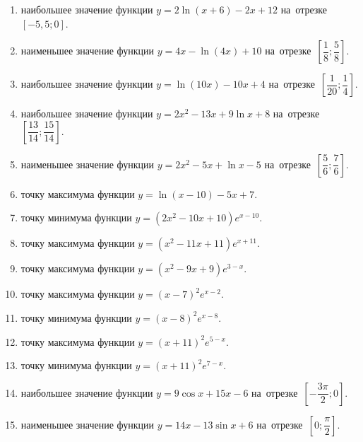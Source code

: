 \documentclass[a4paper,10pt]{article}
\begin{document}
\begin{enumerate}
\item {} наибольшее значение функции $y=2\ln \left(x+6\right)-2x+12$ на~отрезке~$\left[-5,5;0\right]$.

\item {} наименьшее значение функции $y=4x-\ln \left(4x\right)+10$ на~отрезке~$\left[\dfrac{1}{8};\dfrac{5}{8}\right]$.

\item {} наибольшее значение функции $y=\ln \left(10x\right)-10x+4$ на~отрезке~$\left[\dfrac{1}{20};\dfrac{1}{4}\right]$.

\item {} наибольшее значение функции $y=2x^2-13x+9\ln x+8$ на~отрезке~$\left[\dfrac{13}{14};\dfrac{15}{14}\right]$.

\item {} наименьшее значение функции $y=2x^2-5x+\ln x-5$ на~отрезке~$\left[\dfrac{5}{6};\dfrac{7}{6}\right]$.

\item {} точку максимума функции $y=\ln \left(x-10\right)-5x+7$.

\item {} точку минимума функции $y=\left(2x^2-10x+10\right)e^{x-10}$.

\item {} точку максимума функции $y=\left(x^2-11x+11\right)e^{x+11}$.

\item {} точку максимума функции $y=\left(x^2-9x+9\right)e^{3-x}$.

\item {} точку максимума функции $y=\left(x-7\right)^2e^{x-2}$.

\item {} точку минимума функции $y=\left(x-8\right)^2e^{x-8}$.

\item {} точку максимума функции $y=\left(x+11\right)^2e^{5-x}$.

\item {} точку минимума функции $y=\left(x+11\right)^2e^{7-x}$.

\item {} наибольшее значение функции $y=9\cos x+15x-6$ на~отрезке~$\left[-\dfrac{3\pi }{2};0\right]$.

\item {} наименьшее значение функции $y=14x-13\sin x+6$ на~отрезке~$\left[0;\dfrac{\pi }{2}\right]$.


\end{enumerate}
\end{document}
